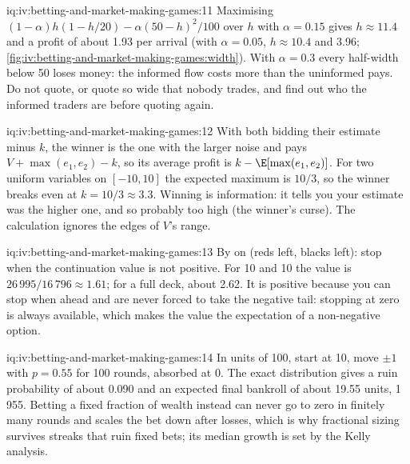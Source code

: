 \begin{solution}{iq:iv:betting-and-market-making-games:11}
Maximising $(1 - \alpha)h(1 - h/20) - \alpha(50 - h)^2/100$ over $h$ with $\alpha = 0.15$ gives $h \approx 11.4$
and a profit of about 1.93 per arrival (with $\alpha = 0.05$, $h \approx 10.4$ and 3.96;
\cref{fig:iv:betting-and-market-making-games:width}). With $\alpha = 0.3$ every half-width below 50 loses money:
the informed flow costs more than the uninformed pays. Do not quote, or quote so wide that nobody trades, and find
out who the informed traders are before quoting again.
\end{solution}

\begin{solution}{iq:iv:betting-and-market-making-games:12}
With both bidding their estimate minus $k$, the winner is the one with the larger noise and pays $V + \max(e_1, e_2) -
k$, so its average profit is $k - \E[\max(e_1, e_2)]$. For two uniform variables on $[-10, 10]$ the expected maximum
is $10/3$, so the winner breaks even at $k = 10/3 \approx 3.3$. Winning is information: it tells you your estimate
was the higher one, and so probably too high (the winner's curse). The calculation ignores the edges of $V$'s range.
\end{solution}

\begin{solution}{iq:iv:betting-and-market-making-games:13}
By  on (reds left, blacks left): stop when the continuation value is not positive. For 10 and 10 the
value is $26\,995/16\,796 \approx 1.61$; for a full deck, about 2.62. It is positive because you can stop when ahead
and are never forced to take the negative tail: stopping at zero is always available, which makes the value the
expectation of a non-negative option.
\end{solution}

\begin{solution}{iq:iv:betting-and-market-making-games:14}
In units of 100, start at 10, move $\pm1$ with $p = 0.55$ for 100 rounds, absorbed at 0. The exact distribution
gives a ruin probability of about 0.090 and an expected final bankroll of about 19.55 units, 1\,955. Betting a
fixed fraction of wealth instead can never go to zero in finitely many rounds and scales the bet down after losses,
which is why fractional sizing survives streaks that ruin fixed bets; its median growth is set by the Kelly
analysis.
\end{solution}
